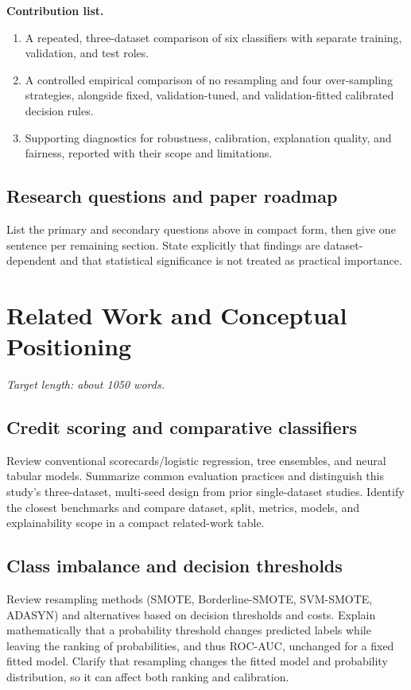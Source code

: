 \documentclass[pdflatex,sn-mathphys-num]{sn-jnl}
\begin{document}
\textbf{Contribution list.}
\begin{enumerate}
  \item A repeated, three-dataset comparison of six classifiers with separate training, validation, and test roles.
  \item A controlled empirical comparison of no resampling and four over-sampling strategies, alongside fixed, validation-tuned, and validation-fitted calibrated decision rules.
  \item Supporting diagnostics for robustness, calibration, explanation quality, and fairness, reported with their scope and limitations.
\end{enumerate}

\subsection{Research questions and paper roadmap}
List the primary and secondary questions above in compact form, then give one sentence per remaining section. State explicitly that findings are dataset-dependent and that statistical significance is not treated as practical importance.

\section{Related Work and Conceptual Positioning}
\textit{Target length: about 1050 words.}

\subsection{Credit scoring and comparative classifiers}
Review conventional scorecards/logistic regression, tree ensembles, and neural tabular models. Summarize common evaluation practices and distinguish this study's three-dataset, multi-seed design from prior single-dataset studies. Identify the closest benchmarks and compare dataset, split, metrics, models, and explainability scope in a compact related-work table.

\subsection{Class imbalance and decision thresholds}
Review resampling methods (SMOTE, Borderline-SMOTE, SVM-SMOTE, ADASYN) and alternatives based on decision thresholds and costs. Explain mathematically that a probability threshold changes predicted labels while leaving the ranking of probabilities, and thus ROC-AUC, unchanged for a fixed fitted model. Clarify that resampling changes the fitted model and probability distribution, so it can affect both ranking and calibration.
\end{document}

